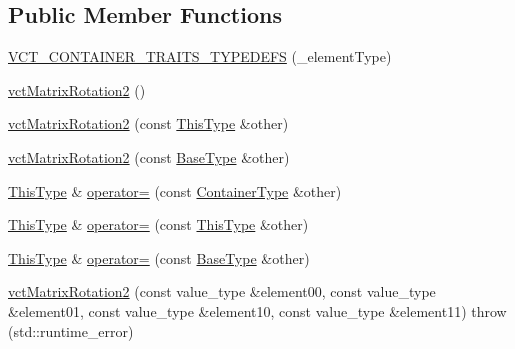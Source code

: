 \subsection*{Public Member Functions}
\begin{DoxyCompactItemize}
\item 
\hyperlink{classvct_matrix_rotation2_a30120b34e9e60e504a0ada920b094b2b}{V\-C\-T\-\_\-\-C\-O\-N\-T\-A\-I\-N\-E\-R\-\_\-\-T\-R\-A\-I\-T\-S\-\_\-\-T\-Y\-P\-E\-D\-E\-F\-S} (\-\_\-element\-Type)
\item 
\hyperlink{classvct_matrix_rotation2_a907508e3326a81a41235ce8bf3c805da}{vct\-Matrix\-Rotation2} ()
\item 
\hyperlink{classvct_matrix_rotation2_a95e5e339925fbda7fe04b1240f0d3f98}{vct\-Matrix\-Rotation2} (const \hyperlink{classvct_fixed_size_const_matrix_base_a7ec66a96ed7e08ce9ff54093133c9d8d}{This\-Type} \&other)
\item 
\hyperlink{classvct_matrix_rotation2_a6d34c2bbd96fd9177d52eea69a52c0d6}{vct\-Matrix\-Rotation2} (const \hyperlink{classvct_matrix_rotation2_a6d9fad3de3e445606a22bf1a3e9da631}{Base\-Type} \&other)
\item 
\hyperlink{classvct_fixed_size_const_matrix_base_a7ec66a96ed7e08ce9ff54093133c9d8d}{This\-Type} \& \hyperlink{classvct_matrix_rotation2_ad60f8a82d28ff8065c60efe2b51e9848}{operator=} (const \hyperlink{classvct_matrix_rotation2_ab84e040499a56ef9c8ab6b3a57e09479}{Container\-Type} \&other)
\item 
\hyperlink{classvct_fixed_size_const_matrix_base_a7ec66a96ed7e08ce9ff54093133c9d8d}{This\-Type} \& \hyperlink{classvct_matrix_rotation2_a7389636970e3a7abaa1b51c74da2374d}{operator=} (const \hyperlink{classvct_fixed_size_const_matrix_base_a7ec66a96ed7e08ce9ff54093133c9d8d}{This\-Type} \&other)
\item 
\hyperlink{classvct_fixed_size_const_matrix_base_a7ec66a96ed7e08ce9ff54093133c9d8d}{This\-Type} \& \hyperlink{classvct_matrix_rotation2_aef85a096b2028bc5fc6c61fe564013a2}{operator=} (const \hyperlink{classvct_matrix_rotation2_a6d9fad3de3e445606a22bf1a3e9da631}{Base\-Type} \&other)
\item 
\hyperlink{classvct_matrix_rotation2_a1443f4417658764277b5cd9deb0615d3}{vct\-Matrix\-Rotation2} (const value\-\_\-type \&element00, const value\-\_\-type \&element01, const value\-\_\-type \&element10, const value\-\_\-type \&element11)  throw (std\-::runtime\-\_\-error)
\item 

\end{DoxyCompactItemize}

